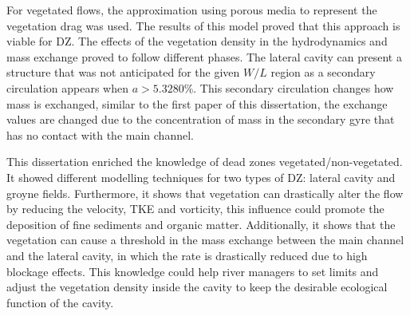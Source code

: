 For vegetated flows, the approximation using porous media to represent the vegetation drag was used. The results of this model proved that this approach is viable for DZ. The effects of the vegetation density in the hydrodynamics and mass exchange proved to follow different phases. The lateral cavity can present a structure that was not anticipated for the given $W/L$ region as a secondary circulation appears when $a>5.3280$\%. This secondary circulation changes how mass is exchanged, similar to the first paper of this dissertation, the exchange values are changed due to the concentration of mass in the secondary gyre that has no contact with the main channel.

This dissertation enriched the knowledge of dead zones vegetated/non-vegetated. It showed different modelling techniques for two types of DZ: lateral cavity and groyne fields. Furthermore, it shows that vegetation can drastically alter the flow by reducing the velocity, TKE and vorticity, this influence could promote the deposition of fine sediments and organic matter. Additionally, it shows that the vegetation can cause a threshold in the mass exchange between the main channel and the lateral cavity, in which the rate is drastically reduced due to high blockage effects. This knowledge could help river managers to set limits and adjust the vegetation density inside the cavity to keep the desirable ecological function of the cavity.

